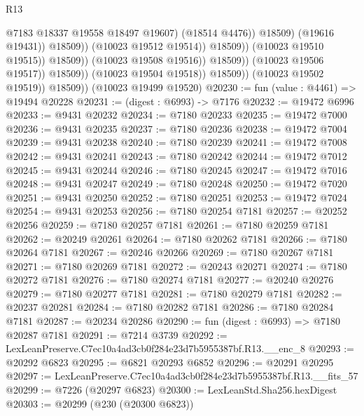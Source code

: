 \begin{lexlean}{R13}
\begin{coremodule}
                                                    @7183
                                                    @18337
                                                    @19558
                                                    @18497
                                                    @19607)
                                                  (@18514 @4476))
                                                @18509)
                                              (@19616 @19431))
                                            @18509))
                                        (@10023 @19512 @19514))
                                      @18509))
                                  (@10023 @19510 @19515))
                                @18509))
                            (@10023 @19508 @19516))
                          @18509))
                      (@10023 @19506 @19517))
                    @18509))
                (@10023 @19504 @19518))
              @18509))
          (@10023 @19502 @19519))
        @18509))
    (@10023 @19499 @19520)
@20230 := fun (value : @4461) => @19494 @20228
@20231 := (digest : @6993) -> @7176
@20232 := @19472 @6996
@20233 := @9431 @20232
@20234 := @7180 @20233
@20235 := @19472 @7000
@20236 := @9431 @20235
@20237 := @7180 @20236
@20238 := @19472 @7004
@20239 := @9431 @20238
@20240 := @7180 @20239
@20241 := @19472 @7008
@20242 := @9431 @20241
@20243 := @7180 @20242
@20244 := @19472 @7012
@20245 := @9431 @20244
@20246 := @7180 @20245
@20247 := @19472 @7016
@20248 := @9431 @20247
@20249 := @7180 @20248
@20250 := @19472 @7020
@20251 := @9431 @20250
@20252 := @7180 @20251
@20253 := @19472 @7024
@20254 := @9431 @20253
@20256 := @7180 @20254 @7181
@20257 := @20252 @20256
@20259 := @7180 @20257 @7181
@20261 := @7180 @20259 @7181
@20262 := @20249 @20261
@20264 := @7180 @20262 @7181
@20266 := @7180 @20264 @7181
@20267 := @20246 @20266
@20269 := @7180 @20267 @7181
@20271 := @7180 @20269 @7181
@20272 := @20243 @20271
@20274 := @7180 @20272 @7181
@20276 := @7180 @20274 @7181
@20277 := @20240 @20276
@20279 := @7180 @20277 @7181
@20281 := @7180 @20279 @7181
@20282 := @20237 @20281
@20284 := @7180 @20282 @7181
@20286 := @7180 @20284 @7181
@20287 := @20234 @20286
@20290 := fun (digest : @6993) => @7180 @20287 @7181
@20291 := @7214 @3739
@20292 := LexLeanPreserve.C7ec10a4ad3cb0f284e23d7b5955387bf.R13.__enc_8
@20293 := @20292 @6823
@20295 := @6821 @20293 @6852
@20296 := @20291 @20295
@20297 := LexLeanPreserve.C7ec10a4ad3cb0f284e23d7b5955387bf.R13.__fits_57
@20299 := @7226 (@20297 @6823)
@20300 := LexLeanStd.Sha256.hexDigest
@20303 := @20299 (@230 (@20300 @6823))

\end{coremodule}
\end{lexlean}
